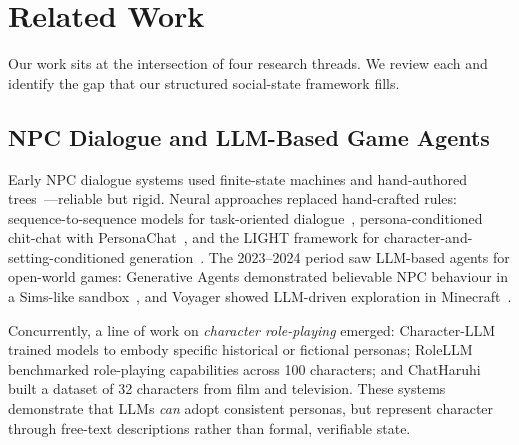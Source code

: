 \documentclass[11pt]{article}
\begin{document}
\section{Related Work}
\label{sec:related}

Our work sits at the intersection of four research threads.
We review each and identify the gap that our structured social-state framework fills.

\subsection{NPC Dialogue and LLM-Based Game Agents}

Early NPC dialogue systems used finite-state machines and hand-authored trees~\cite{walker2006individual}---reliable but rigid.
Neural approaches replaced hand-crafted rules: sequence-to-sequence models for task-oriented dialogue~\cite{bordes2017learning}, persona-conditioned chit-chat with PersonaChat~\cite{zhang2018personalizing}, and the LIGHT framework for character-and-setting-conditioned generation~\cite{urbanek2019learning}.
The 2023--2024 period saw LLM-based agents for open-world games: Generative Agents demonstrated believable NPC behaviour in a Sims-like sandbox~\cite{park2023generative}, and Voyager showed LLM-driven exploration in Minecraft~\cite{wang2023voyager}.

Concurrently, a line of work on \textit{character role-playing} emerged: Character-LLM~\cite{shao2023character} trained models to embody specific historical or fictional personas; RoleLLM~\cite{wang2024rolellm} benchmarked role-playing capabilities across 100 characters; and ChatHaruhi~\cite{li2023chatharuhi} built a dataset of 32 characters from film and television.
These systems demonstrate that LLMs \textit{can} adopt consistent personas, but represent character through free-text descriptions rather than formal, verifiable state.
\end{document}
